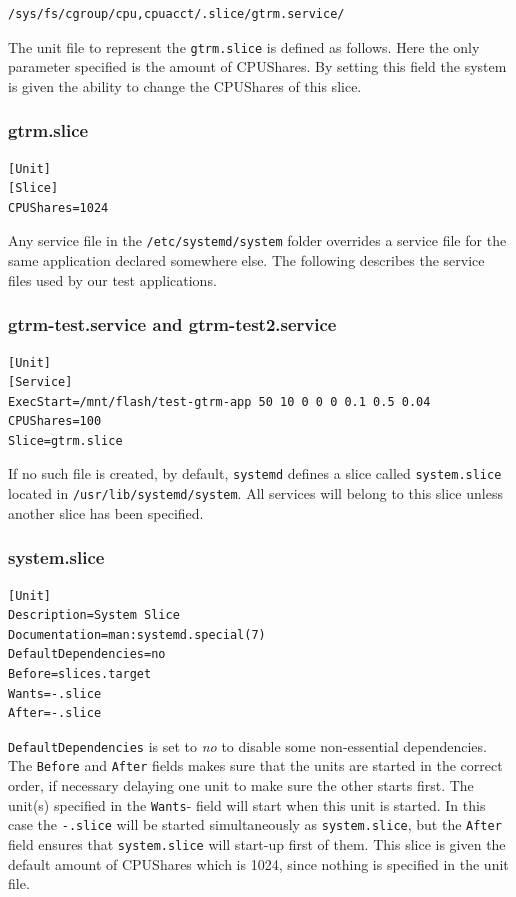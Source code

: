 \documentclass[nobiblatex]{LTHthesis}
\begin{document}
\begin{verbatim}
/sys/fs/cgroup/cpu,cpuacct/.slice/gtrm.service/
\end{verbatim}

The unit file to represent the \texttt{gtrm.slice} is defined as follows. Here the only parameter specified is the amount of CPUShares. By setting this field the system is given the ability to change the CPUShares of this slice.
\subsubsection{gtrm.slice}
\begin{verbatim}
[Unit]
[Slice]
CPUShares=1024
\end{verbatim}

Any service file in the \texttt{/etc/systemd/system} folder overrides a service file for the same application declared somewhere else. The following describes the service files used by our test applications.

\subsubsection{gtrm-test.service and gtrm-test2.service}
\begin{verbatim}
[Unit]
[Service]
ExecStart=/mnt/flash/test-gtrm-app 50 10 0 0 0 0.1 0.5 0.04
CPUShares=100
Slice=gtrm.slice
\end{verbatim}

If no such file is created, by default, \texttt{systemd} defines a slice called \texttt{system.slice} located in \texttt{/usr/lib/systemd/system}. All services will belong to this slice unless another slice has been specified. 
\subsubsection{system.slice}
\begin{verbatim}
[Unit]
Description=System Slice
Documentation=man:systemd.special(7)
DefaultDependencies=no
Before=slices.target
Wants=-.slice
After=-.slice
\end{verbatim}

\texttt{DefaultDependencies} is set to \emph{no} to disable some non-essential 
dependencies. The \texttt{Before} and \texttt{After} fields makes sure that 
the units are started in the correct order, if necessary delaying one unit to 
make sure the other starts first. The unit(s) specified in the \texttt{Wants}-
field will start when this unit is started. In this case the \texttt{-.slice} 
will be started simultaneously as \texttt{system.slice}, but the 
\texttt{After} field ensures that \texttt{system.slice} will start-up first of 
them. This slice is given the default amount of CPUShares which is 1024, since 
nothing is specified in the unit file.
\end{document}
